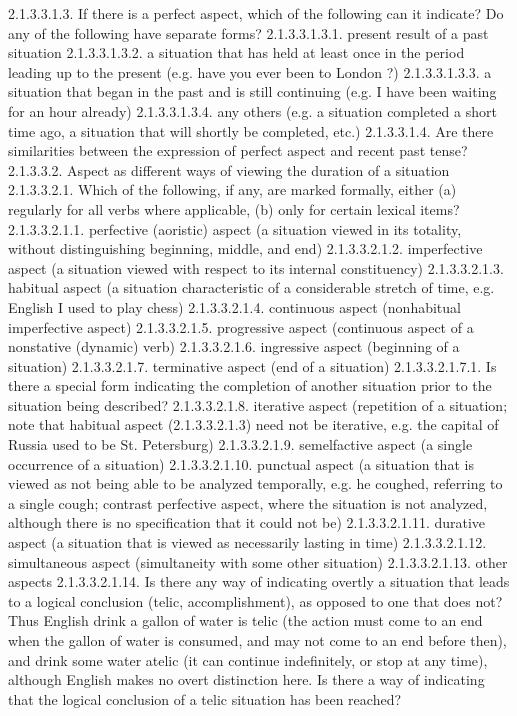 2.1.3.3.1.3. If there is a perfect aspect, which of the following can it indicate? Do any of the following have separate forms?
2.1.3.3.1.3.1. present result of a past situation
2.1.3.3.1.3.2. a situation that has held at least once in the period leading up to the present (e.g. have you ever been to London ?)
2.1.3.3.1.3.3. a situation that began in the past and is still continuing (e.g. I have been waiting for an hour already)
2.1.3.3.1.3.4. any others (e.g. a situation completed a short time ago, a situation that will shortly be completed, etc.)
2.1.3.3.1.4. Are there similarities between the expression of perfect aspect and recent past tense?
2.1.3.3.2. Aspect as different ways of viewing the duration of a situation
2.1.3.3.2.1. Which of the following, if any, are marked formally, either (a) regularly for all verbs where applicable, (b) only for certain lexical items?
2.1.3.3.2.1.1. perfective (aoristic) aspect (a situation viewed in its totality, without distinguishing beginning, middle, and end)
2.1.3.3.2.1.2. imperfective aspect (a situation viewed with respect to its internal constituency)
2.1.3.3.2.1.3. habitual aspect (a situation characteristic of a considerable stretch of time, e.g. English I used to play chess)
2.1.3.3.2.1.4. continuous aspect (nonhabitual imperfective aspect)
2.1.3.3.2.1.5. progressive aspect (continuous aspect of a nonstative (dynamic) verb)
2.1.3.3.2.1.6. ingressive aspect (beginning of a situation)
2.1.3.3.2.1.7. terminative aspect (end of a situation)
2.1.3.3.2.1.7.1. Is there a special form indicating the completion of another situation prior to the situation being described?
2.1.3.3.2.1.8. iterative aspect (repetition of a situation; note that habitual aspect (2.1.3.3.2.1.3) need not be iterative, e.g. the capital of Russia used to be St. Petersburg)
2.1.3.3.2.1.9. semelfactive aspect (a single occurrence of a situation)
2.1.3.3.2.1.10. punctual aspect (a situation that is viewed as not being able to be analyzed temporally, e.g. he coughed, referring to a single cough; contrast perfective aspect, where the situation is not analyzed, although there is no specification that it could not be)
2.1.3.3.2.1.11. durative aspect (a situation that is viewed as necessarily lasting in time)
2.1.3.3.2.1.12. simultaneous aspect (simultaneity with some other situation)
2.1.3.3.2.1.13. other aspects
2.1.3.3.2.1.14. Is there any way of indicating overtly a situation that leads to a logical conclusion (telic, accomplishment), as opposed to one that does not?
Thus English drink a gallon of water is telic (the action must come to an end when the gallon of water is consumed, and may not come to an end before then), and drink some water atelic (it can continue indefinitely, or stop at any time), although English makes no overt distinction here. Is there a way of indicating that the logical conclusion of a telic situation has been reached?
